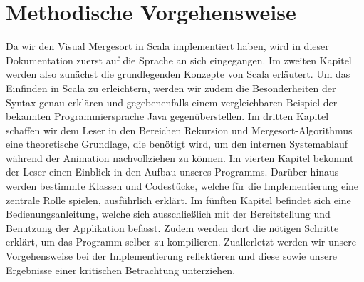 \section{Methodische Vorgehensweise}
Da wir den Visual Mergesort in Scala implementiert haben, wird in dieser Dokumentation zuerst auf die Sprache an sich eingegangen. Im zweiten Kapitel werden also zunächst die grundlegenden Konzepte von Scala erläutert. Um das Einfinden in Scala zu erleichtern, werden wir zudem die Besonderheiten der Syntax genau erklären und gegebenenfalls einem vergleichbaren Beispiel der bekannten Programmiersprache Java gegenüberstellen. Im dritten Kapitel schaffen wir dem Leser in den Bereichen Rekursion und Mergesort-Algorithmus eine theoretische Grundlage, die benötigt wird, um den internen Systemablauf während der Animation nachvollziehen zu können. Im vierten Kapitel bekommt der Leser einen Einblick in den Aufbau unseres Programms. Darüber hinaus werden bestimmte Klassen und Codestücke, welche für die Implementierung eine zentrale Rolle spielen, ausführlich erklärt. Im fünften Kapitel befindet sich eine Bedienungsanleitung, welche sich ausschließlich mit der Bereitstellung und Benutzung der Applikation befasst. Zudem werden dort die nötigen Schritte erklärt, um das Programm selber zu kompilieren. Zuallerletzt werden wir unsere Vorgehensweise bei der Implementierung reflektieren und diese sowie unsere Ergebnisse einer kritischen Betrachtung unterziehen.
